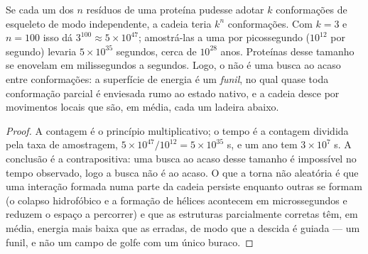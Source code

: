 \begin{theorem}\label{thm:b3:structural-biology:levinthal}
Se cada um dos $n$ resíduos de uma proteína pudesse adotar $k$
conformações de esqueleto de modo independente, a cadeia teria $k^{n}$
conformações. Com $k = 3$ e $n = 100$ isso dá $3^{100} \approx
5\times 10^{47}$; amostrá-las a uma por picossegundo ($10^{12}$ por
segundo) levaria $5\times 10^{35}$ segundos, cerca de $10^{28}$ anos.
Proteínas desse tamanho se enovelam em milissegundos a segundos. Logo,
o  não é uma busca ao acaso entre conformações: a
superfície de energia é um \emph{funil}, no qual quase toda conformação
parcial é enviesada rumo ao estado nativo, e a cadeia desce por
movimentos locais que são, em média, cada um ladeira abaixo.
\end{theorem}
\begin{proof}
A contagem é o princípio multiplicativo; o tempo é a contagem dividida
pela taxa de amostragem, $5\times 10^{47}/10^{12} = 5\times
10^{35}$ s,
e um ano tem $3\times 10^{7}$ s. A conclusão é a contrapositiva: uma
busca ao acaso desse tamanho é impossível no tempo observado, logo a
busca não é ao acaso. O que a torna não aleatória é que uma interação
formada numa parte da cadeia persiste enquanto outras se formam (o
colapso hidrofóbico e a formação de hélices acontecem em microssegundos
e reduzem o espaço a percorrer) e que as estruturas parcialmente
corretas têm, em média, energia mais baixa que as erradas, de modo que
a descida é guiada --- um funil, e não um campo de golfe com um único
buraco.
\end{proof}

